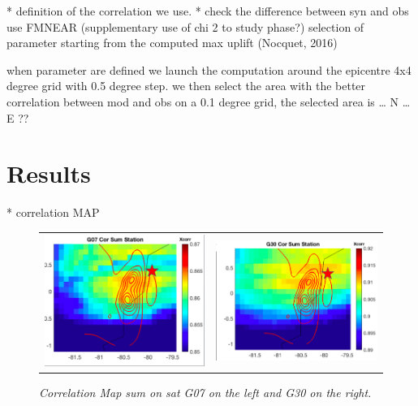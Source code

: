 \documentclass{gji}
\begin{document}
* definition of the correlation we use.
*  check the difference between syn and obs use FMNEAR
                (supplementary use of chi 2 to study phase?) 
    selection of parameter
        starting from the computed max uplift (Nocquet, 2016)
       
      
        when parameter are defined we launch the computation around the epicentre 4x4 degree grid with 0.5 degree step. we then select the area with the better correlation between mod and obs on a 0.1 degree grid, the selected area is … N …E ??
        
        
        \section{Results}
        
        
        
        * correlation MAP


\begin{figure}
 \begin{tabular}{l r}
\includegraphics[width=0.44\linewidth]{images/cor_Map_G30_old.png} & 
\includegraphics[width=0.50\linewidth]{images/cor_Map_G07_old.png}
 
\end{tabular}
\caption{ \textit{\emph{Correlation Map sum on sat G07 on the left and G30 on the right}.    }}
\label{Corr_Map}
\end{figure}
\end{document}
